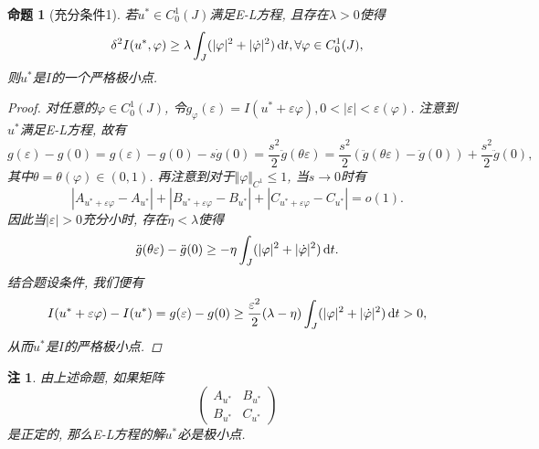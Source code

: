 \documentclass[12pt,a4paper]{article}
\newtheorem{proposition}[theorem]{命题}
\newtheorem{remark}[theorem]{注}
\begin{document}
\begin{proposition}[充分条件1]\label{prop1.10}
    若$u^* \in C_0^1(J)$满足E-L方程, 且存在$\lambda > 0$使得
    \begin{equation*}
        \delta^2I(u^*, \varphi) \geq \lambda\int_J(|\varphi|^2+|\dot\varphi|^2) \,{\rm d}t, \forall \varphi \in C_0^1(J),
    \end{equation*}
    则$u^*$是$I$的一个严格极小点.
    \begin{proof}
        对任意的$\varphi \in C_0^1(J)$, 令$g_{\varphi}(\varepsilon) = I(u^* + \varepsilon\varphi), 0 < |\varepsilon| < \varepsilon(\varphi)$.
        注意到$u^*$满足E-L方程, 故有 
        \begin{equation*}
            g(\varepsilon) - g(0) = g(\varepsilon) - g(0) - s\dot g(0) = \frac{s^2}{2}\ddot g(\theta \varepsilon) = \frac{s^2}{2}(\ddot g(\theta \varepsilon) - \ddot g(0)) + \frac{s^2}{2}\ddot g(0), 
        \end{equation*}
        其中$\theta = \theta(\varphi) \in (0, 1)$. 再注意到对于$\Vert \varphi \Vert_{C^1} \leq 1$, 当$s \rightarrow 0$时有 
        \begin{equation*}
            |A_{u^* + \varepsilon\varphi} - A_{u^*}| + |B_{u^* + \varepsilon\varphi} - B_{u^*}| + |C_{u^* + \varepsilon\varphi} - C_{u^*}| = o(1).
        \end{equation*}
        因此当$|\varepsilon| > 0$充分小时, 存在$\eta < \lambda$使得 
        \begin{equation*}
            \ddot g(\theta \varepsilon) - \ddot g(0) \geq -\eta\int_J(|\varphi|^2 + |\dot\varphi|^2) \,{\rm d}t.
        \end{equation*}
        结合题设条件, 我们便有
        \begin{equation*}
            I(u^* + \varepsilon\varphi) - I(u^*) = g(\varepsilon) - g(0) \geq \frac{\varepsilon^2}{2}(\lambda - \eta)\int_J(|\varphi|^2 + |\dot\varphi|^2) \,{\rm d}t > 0,
        \end{equation*} 
        从而$u^*$是$I$的严格极小点.
    \end{proof}
\end{proposition}

\begin{remark}
    由上述命题, 如果矩阵
    \begin{equation*}
        \begin{pmatrix} 
            A_{u^*} & B_{u^*} \\ 
            B_{u^*} & C_{u^*} 
        \end{pmatrix} 
    \end{equation*} 
    是正定的, 那么E-L方程的解$u^*$必是极小点.
\end{remark}
\end{document}
